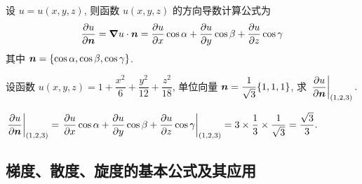 \begin{theorem}
    设 $u=u(x,y,z)$, 则函数 $u(x,y,z)$ 的方向导数计算公式为
    $$\pdv{u}{\vb*{n}}=\grad u\cdot\vb*{n}=\pdv{u}{x}\cos\alpha+\pdv{u}{y}\cos\beta+\pdv{u}{z}\cos\gamma$$
    其中 $\vb*{n}=\qty{\cos\alpha,\cos\beta,\cos\gamma}$.
\end{theorem}

\begin{example}[2005 数一]
    设函数 $u(x,y,z)=1+\dfrac{x^2}{6}+\dfrac{y^2}{12}+\dfrac{z^2}{18}$, 单位向量 $\vb*{n}=\dfrac{1}{\sqrt{3}}\qty{1,1,1}$, 求
    $\displaystyle \eval{\pdv{u}{\vb*{n}}}_{(1,2,3)}.$
\end{example}
\begin{solution}
    $\displaystyle\eval{\pdv{u}{\vb*{n}}}_{(1,2,3)}=\eval{\pdv{u}{x}\cos\alpha+\pdv{u}{y}\cos\beta+\pdv{u}{z}\cos\gamma}_{(1,2,3)}=3\times\dfrac{1}{3}\times\dfrac{1}{\sqrt{3}}=\dfrac{\sqrt{3}}{3}.$
\end{solution}

\subsection{梯度、散度、旋度的基本公式及其应用}

